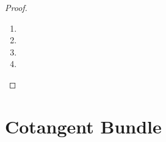 \documentclass{book}
\begin{document}
\begin{proof}\
	\begin{enumerate}
		\item 
		\item 
		\item 
		\item 
	\end{enumerate}
\end{proof}










































\newpage
\section{Cotangent Bundle}
\end{document}
